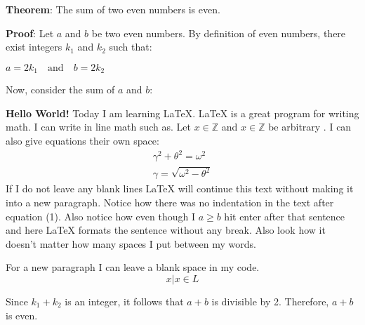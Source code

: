 \documentclass{article}
\begin{document}
\textbf{Theorem}: The sum of two even numbers is even.

\textbf{Proof}: Let $a$ and $b$ be two even numbers. By definition of even numbers, there exist integers $k_1$ and $k_2$ such that:

$a = 2k_1 \quad \text{and} \quad b = 2k_2$

Now, consider the sum of $a$ and $b$:

    \textbf{Hello World!} Today I am learning \LaTeX. %
     \LaTeX{} is a great program for writing math. I can write in line math such as. Let $x \in \mathbb{Z}$ and  $x \in \mathbb{Z}$ be arbitrary %
     . I can also give equations their own space: 
    \begin{equation}  \label{eq1} %
        \begin{split}            
            \gamma^2+\theta^2=\omega^2 \\
            \gamma = \sqrt{\omega^2 - \theta^2}
        \end{split}
    \end{equation}
    If I do not leave any blank lines \LaTeX{} will continue  this text without making it into a new paragraph.  Notice how there was no indentation in the text after equation (1).  
    Also notice how even though I
    $a \geq b $  hit enter after that sentence and here 
     \LaTeX{} formats the sentence without any break.  Also   look  how      it   doesn't     matter          how    many  spaces     I put     between       my    words.
    
    For a new paragraph I can leave a blank space in my code.  $${x \vert x} \in L$$

Since $k_1 + k_2$ is an integer, it follows that $a + b$ is divisible by 2. Therefore, $a + b$ is even.
\end{document}
